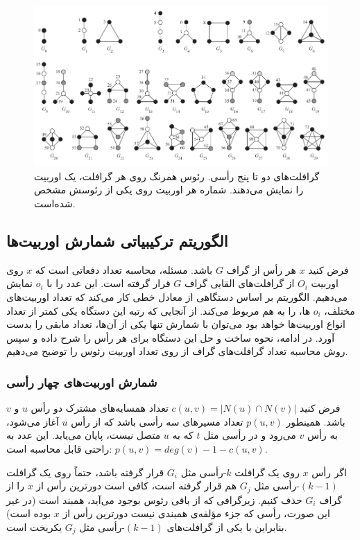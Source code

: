 \begin{figure}[t]
\centering
\includegraphics[scale=0.4]{./graphlets.png}
\caption{گرافلت‌های دو تا پنج رأسی. رئوس همرنگ روی هر گرافلت، یک اوربیت را نمایش می‌دهند. شماره هر اوربیت روی یکی از رئوسش مشخص شده‌است.}
\label{fig:graphlets}
\end{figure}

\subsection{الگوریتم ترکیبیاتی شمارش اوربیت‌ها}
فرض کنید $x$ هر رأس از گراف $G$ باشد. مسئله، محاسبه تعداد دفعاتی است که $x$  روی اوربیت $O_i$ از گرافلت‌های القایی گراف $G$ قرار گرفته است. این عدد را با $o_i$ نمایش می‌دهیم. الگوریتم بر اساس دستگاهی از معادل خطی کار می‌کند که تعداد اوربیت‌های مختلف، $o_i$ ها، را به هم مربوط می‌کند. از آنجایی که رتبه این دستگاه یکی کمتر از تعداد انواع اوربیت‌ها خواهد بود می‌توان با شمارش تنها یکی از آن‌ها، تعداد مابقی را بدست آورد. در ادامه، نحوه ساخت و حل این دستگاه برای هر رأس را شرح داده و سپس روش محاسبه تعداد گرافلت‌های گراف از روی تعداد اوربیت رئوس را توضیح می‌دهیم.

\subsubsection{شمارش اوربیت‌های چهار رأسی}
فرض کنید $c(u,v) = |N(u) \cap N(v)|$ تعداد همسایه‌های مشترک دو رأس $u$ و $v$ باشد. همینطور $p(u,v)$ تعداد مسیرهای سه رأسی باشد که از رأس $u$ آغاز می‌شود، به رأس $v$ می‌رود و در رأسی مثل $t$ که به $u$ متصل نیست، پایان می‌یابد. این عدد به راحتی قابل محاسبه است: 
$p(u,v) = deg(v) -1 -c(u,v)$.

اگر رأس $x$ روی یک گرافلت $k$-رأسی مثل $G_i$ قرار گرفته باشد، حتماً روی یک گرافلت $(k-1)$-رأسی مثل $G_j$ هم قرار گرفته است، کافی است دورترین رأس از $x$ را از گراف $G_i$ حذف کنیم. زیرگرافی که از باقی رئوس بوجود می‌آید، همبند است (در غیر این صورت، رأسی که جزء مؤلفه‌ی همبندی نیست دورترین رأس از $x$ بوده است) بنابراین با یکی از گرافلت‌های $(k-1)$-رأسی مثل $G_j$ یکریخت است.

